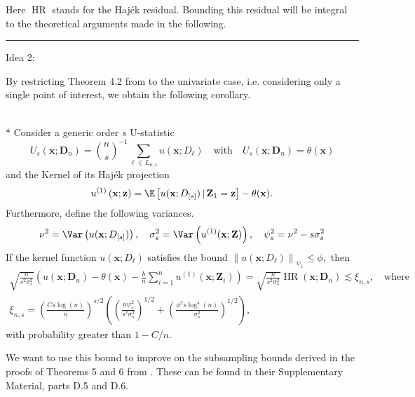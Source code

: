 Here $\operatorname{HR}$ stands for the Haj\'ek residual.
Bounding this residual will be integral to the theoretical arguments made in the following.

\hrule

{\color{red} Idea 2:}

By restricting Theorem 4.2 from \citet{ritzwoller_uniform_2024} to the univariate case, i.e. considering only a single point of interest, we obtain the following corollary.
\begin{cor}\mbox{}\\*
	Consider a generic order $s$ U-statistic
	\begin{equation}
		U_{s}(\mathbf{x}; \mathbf{D}_n)
		= \binom{n}{s}^{-1} \sum_{\ell \in L_{n,s}}u(\mathbf{x}; D_{\ell})
		\quad \text{with} \quad
		U_{s}(\mathbf{x}; \mathbf{D}_n) = \theta(\mathbf{x})
	\end{equation}
	and the Kernel of its Haj\'ek projection
	\begin{equation}
		u^{(1)}\left(\mathbf{x}; \mathbf{z}\right)
		= \E\left[u(\mathbf{x}; D_{[s]}) \, | \, \mathbf{Z}_1 = \mathbf{z}\right] - \theta(\mathbf{x}).
	\end{equation}
	Furthermore, define the following variances.
	\begin{equation}
		\nu^2 = \Var\left(u(\mathbf{x}; D_{[s]})\right), \quad
		\sigma_{s}^2 = \Var\left(u^{(1)}(\mathbf{x}; \mathbf{Z})\right), \quad
		\psi_{s}^2 = \nu^2 - s \sigma_{s}^2
	\end{equation}
	If the kernel function $u\left(\mathbf{x} ; D_{\ell}\right)$ satisfies the bound
	$\left\|u(\mathbf{x}; D_{\ell})\right\|_{\psi_1} \leq \phi,$
	then
	\begin{align}
		\sqrt{\frac{n}{{s}^2 \sigma_{s}^2}}
		\left(u(\mathbf{x}; \mathbf{D}_n) - \theta(\mathbf{x}) - \frac{b}{n} \sum_{i=1}^n u^{(1)}(\mathbf{x}; \mathbf{Z}_{i})\right)
		= \sqrt{\frac{n}{{s}^2 \sigma_{s}^2}} \operatorname{HR}(\mathbf{x}; \mathbf{D}_n)
		\lesssim \xi_{n, s},
		\quad \text {where} \\
		\xi_{n, s}
		= \left(\frac{C s \log(n)}{n}\right)^{s / 2}\left(\left(\frac{n \psi_{s}^2}{{s}^2 \sigma_{s}^2}\right)^{1 / 2}+\left(\frac{\phi^2 s \log ^4(n)}{\sigma_{s}^2}\right)^{1 / 2}\right),
	\end{align}
	with probability greater than $1-C / n$.
\end{cor}

We want to use this bound to improve on the subsampling bounds derived in the proofs of Theorems 5 and 6 from \cite{demirkaya_optimal_2024}.
These can be found in their Supplementary Material, parts D.5 and D.6.